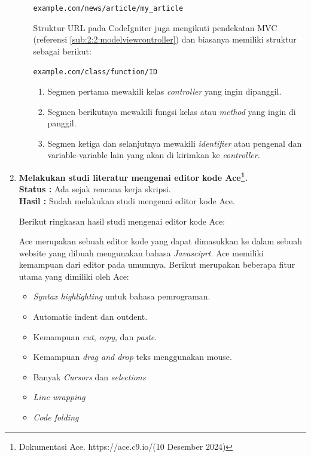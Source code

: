 \documentclass[a4paper,twoside]{article}
\begin{document}
\begin{enumerate}
\begin{enumerate}
		            \begin{center}
			            \verb|example.com/news/article/my_article|
		            \end{center}

		            Struktur URL pada CodeIgniter juga mengikuti pendekatan MVC (referensi \ref{sub:2:2:modelviewcontroller}) dan biasanya memiliki struktur sebagai berikut:

		            \begin{center}
			            \verb|example.com/class/function/ID|
		            \end{center}

		            \begin{enumerate}
			            \item Segmen pertama mewakili kelas \textit{controller} yang ingin dipanggil.
			            \item Segmen berikutnya mewakili fungsi kelas atau \textit{method} yang ingin di panggil.
			            \item Segmen ketiga dan selanjutnya mewakili \textit{identifier} atau pengenal dan variable-variable lain yang akan di kirimkan ke \textit{controller}.
		            \end{enumerate}
	      \end{enumerate}

	\item \textbf{Melakukan studi literatur mengenai editor kode Ace\footnote{Dokumentasi Ace. https://ace.c9.io/(10 Desember 2024)}.} \\
	      {\bf Status :} Ada sejak rencana kerja skripsi.\\
	      {\bf Hasil :} Sudah melakukan studi mengenai editor kode Ace.

	      Berikut ringkasan hasil studi mengenai editor kode Ace:

	      Ace merupakan sebuah editor kode yang dapat dimasukkan ke dalam sebuah website yang dibuah mengunakan bahasa \textit{Javasciprt}. Ace memiliki kemampuan dari editor pada umumnya. Berikut merupakan beberapa fitur utama yang dimiliki oleh Ace:

	      \begin{itemize}
		      \item \textit{Syntax highlighting} untuk bahasa pemrograman.
		      \item Automatic indent dan  outdent.
		      \item Kemampuan \textit{cut}, \textit{copy}, dan \textit{paste}.
		      \item Kemampuan \textit{drag and drop} teks menggunakan mouse.
		      \item Banyak \textit{Cursors} dan \textit{selections}
		      \item \textit{Line wrapping}
		      \item \textit{Code folding}
	      \end{itemize}


\end{enumerate}
\end{document}
